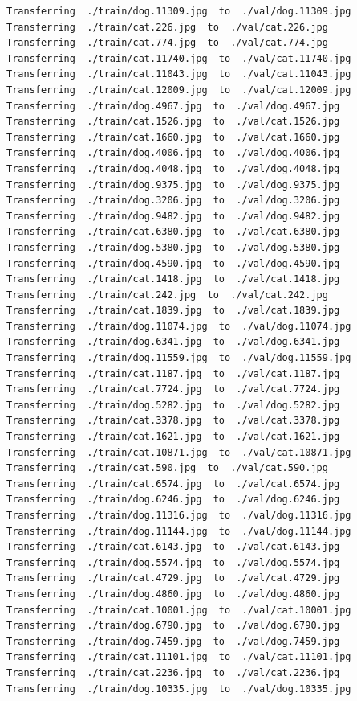 \documentclass[]{book}
\theoremstyle{definition}
\theoremstyle{definition}
\theoremstyle{definition}
\theoremstyle{remark}
\begin{document}
\begin{verbatim}
Transferring  ./train/dog.11309.jpg  to  ./val/dog.11309.jpg
Transferring  ./train/cat.226.jpg  to  ./val/cat.226.jpg
Transferring  ./train/cat.774.jpg  to  ./val/cat.774.jpg
Transferring  ./train/cat.11740.jpg  to  ./val/cat.11740.jpg
Transferring  ./train/cat.11043.jpg  to  ./val/cat.11043.jpg
Transferring  ./train/cat.12009.jpg  to  ./val/cat.12009.jpg
Transferring  ./train/dog.4967.jpg  to  ./val/dog.4967.jpg
Transferring  ./train/cat.1526.jpg  to  ./val/cat.1526.jpg
Transferring  ./train/cat.1660.jpg  to  ./val/cat.1660.jpg
Transferring  ./train/dog.4006.jpg  to  ./val/dog.4006.jpg
Transferring  ./train/dog.4048.jpg  to  ./val/dog.4048.jpg
Transferring  ./train/dog.9375.jpg  to  ./val/dog.9375.jpg
Transferring  ./train/dog.3206.jpg  to  ./val/dog.3206.jpg
Transferring  ./train/dog.9482.jpg  to  ./val/dog.9482.jpg
Transferring  ./train/cat.6380.jpg  to  ./val/cat.6380.jpg
Transferring  ./train/dog.5380.jpg  to  ./val/dog.5380.jpg
Transferring  ./train/dog.4590.jpg  to  ./val/dog.4590.jpg
Transferring  ./train/cat.1418.jpg  to  ./val/cat.1418.jpg
Transferring  ./train/cat.242.jpg  to  ./val/cat.242.jpg
Transferring  ./train/cat.1839.jpg  to  ./val/cat.1839.jpg
Transferring  ./train/dog.11074.jpg  to  ./val/dog.11074.jpg
Transferring  ./train/dog.6341.jpg  to  ./val/dog.6341.jpg
Transferring  ./train/dog.11559.jpg  to  ./val/dog.11559.jpg
Transferring  ./train/cat.1187.jpg  to  ./val/cat.1187.jpg
Transferring  ./train/cat.7724.jpg  to  ./val/cat.7724.jpg
Transferring  ./train/dog.5282.jpg  to  ./val/dog.5282.jpg
Transferring  ./train/cat.3378.jpg  to  ./val/cat.3378.jpg
Transferring  ./train/cat.1621.jpg  to  ./val/cat.1621.jpg
Transferring  ./train/cat.10871.jpg  to  ./val/cat.10871.jpg
Transferring  ./train/cat.590.jpg  to  ./val/cat.590.jpg
Transferring  ./train/cat.6574.jpg  to  ./val/cat.6574.jpg
Transferring  ./train/dog.6246.jpg  to  ./val/dog.6246.jpg
Transferring  ./train/dog.11316.jpg  to  ./val/dog.11316.jpg
Transferring  ./train/dog.11144.jpg  to  ./val/dog.11144.jpg
Transferring  ./train/cat.6143.jpg  to  ./val/cat.6143.jpg
Transferring  ./train/dog.5574.jpg  to  ./val/dog.5574.jpg
Transferring  ./train/cat.4729.jpg  to  ./val/cat.4729.jpg
Transferring  ./train/dog.4860.jpg  to  ./val/dog.4860.jpg
Transferring  ./train/cat.10001.jpg  to  ./val/cat.10001.jpg
Transferring  ./train/dog.6790.jpg  to  ./val/dog.6790.jpg
Transferring  ./train/dog.7459.jpg  to  ./val/dog.7459.jpg
Transferring  ./train/cat.11101.jpg  to  ./val/cat.11101.jpg
Transferring  ./train/cat.2236.jpg  to  ./val/cat.2236.jpg
Transferring  ./train/dog.10335.jpg  to  ./val/dog.10335.jpg

\end{verbatim}
\end{document}
